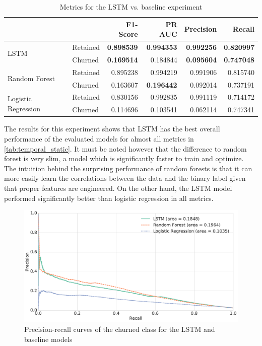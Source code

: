 \documentclass{kththesis}
\begin{document}
\begin{table}
\centering
\begin{tabular}{llrrrr}
\toprule
     &          &  F1-Score &    PR AUC &  Precision &    Recall \\
\midrule
\multirow{2}{*}{LSTM} & Retained &  \textbf{0.898539} &  \textbf{0.994353} &   \textbf{0.992256} &  \textbf{0.820997} \\
     & Churned &  \textbf{0.169514} &  0.184844 &   \textbf{0.095604} &  \textbf{0.747048} \\
\cline{1-6}
\multirow{2}{*}{Random Forest} & Retained &  0.895238 &  0.994219 &   0.991906 &  0.815740 \\
     & Churned &  0.163607 &  \textbf{0.196442} &   0.092014 &  0.737191 \\
\cline{1-6}
\multirow{2}{*}{Logistic Regression} & Retained &  0.830156 &  0.992835 &   0.991119 &  0.714172 \\
     & Churned &  0.114696 &  0.103541 &   0.062114 &  0.747341 \\
\bottomrule
\end{tabular}
\caption{Metrics for the LSTM vs. baseline experiment}
\label{tab:temporal_static}
\end{table}

The results for this experiment shows that LSTM has the best overall performance of the evaluated models for almost all metrics in \autoref{tab:temporal_static}. It must be noted however that the difference to random forest is very slim, a model which is significantly faster to train and optimize. The intuition behind the surprising performance of random forests is that it can more easily learn the correlations between the data and the binary label given that proper features are engineered. On the other hand, the LSTM model performed significantly better than logistic regression in all metrics.

\begin{figure}
    \centering
    \includegraphics[width=1.0\textwidth,keepaspectratio]{figures/prc_temporal_static.pdf}
    \caption{Precision-recall curves of the churned class for the LSTM and baseline models}
    \label{fig:prc_temporal_static}
\end{figure}
\end{document}
